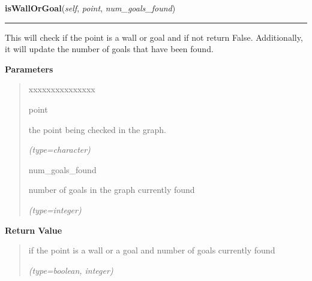     \label{UnBlockMe:Map:Map:Map:isWallOrGoal}

    \vspace{0.5ex}

\hspace{.8\funcindent}\begin{boxedminipage}{\funcwidth}

    \raggedright \textbf{isWallOrGoal}(\textit{self}, \textit{point}, \textit{num\_goals\_found})

    \vspace{-1.5ex}

    \rule{\textwidth}{0.5\fboxrule}
\setlength{\parskip}{2ex}
    This will check if the point is a wall or goal and if not return False.
    Additionally, it will update the number of goals that have been found.

\setlength{\parskip}{1ex}
      \textbf{Parameters}
      \vspace{-1ex}

      \begin{quote}
        \begin{Ventry}{xxxxxxxxxxxxxxx}

          \item[point]

          the point being checked in the graph.

            {\it (type=character)}

          \item[num\_goals\_found]

          number of goals in the graph currently found

            {\it (type=integer)}

        \end{Ventry}

      \end{quote}

      \textbf{Return Value}
    \vspace{-1ex}

      \begin{quote}
      if the point is a wall or a goal and number of goals currently found

      {\it (type=boolean, integer)}

      \end{quote}

    \end{boxedminipage}

